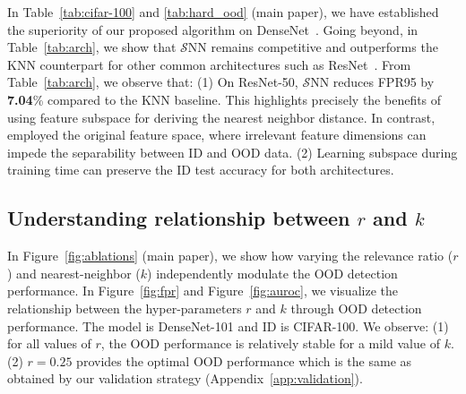 \documentclass[letterpaper]{article} %
\def\name{$\mathcal{S}$NN\xspace}
\theoremstyle{plain}
\theoremstyle{definition}
\theoremstyle{remark}
\begin{document}
 In Table~\ref{tab:cifar-100} and \ref{tab:hard_ood} (main paper), we have established the superiority of our proposed algorithm on DenseNet~\cite{huang2018densely}. Going beyond, in Table~\ref{tab:arch}, we show that \name remains competitive and outperforms the KNN counterpart for other common architectures such as ResNet~\cite{he2016deep}. From Table~\ref{tab:arch}, we observe that: (1) On ResNet-50, \name reduces FPR95 by \textbf{7.04}\% compared to the KNN baseline. This highlights precisely the benefits of using feature subspace for deriving the nearest neighbor distance. In contrast, \cite{sun2022knn} employed the original feature space, where irrelevant feature dimensions can impede the separability between ID and OOD data.
(2) Learning subspace during training time can preserve the ID test accuracy for both architectures.



\subsection{Understanding relationship between $r$ and $k$}
\label{app:rel}

In Figure~\ref{fig:ablations} (main paper), we show how varying the relevance ratio ($r$) and nearest-neighbor ($k$) independently modulate the OOD detection performance. In Figure~\ref{fig:fpr} and Figure~\ref{fig:auroc}, we visualize the relationship between the hyper-parameters $r$ and $k$ through OOD detection performance. The model is DenseNet-101 and ID is CIFAR-100. We observe: (1) for all values of $r$, the OOD performance is relatively stable for a mild value of $k$. (2) $r=0.25$ provides the optimal OOD performance which is the same as obtained by our validation strategy (Appendix~\ref{app:validation}).
\end{document}
